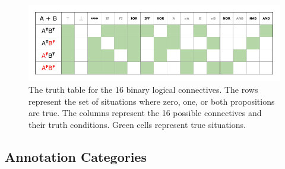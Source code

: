 \documentclass[floatsintext,man]{apa6}
\theoremstyle{definition}
\theoremstyle{definition}
\theoremstyle{definition}
\theoremstyle{remark}
\begin{document}
\begin{figure}[tb]

{\centering \includegraphics{figs/logicalConnectives-1} 

}

\caption{The truth table for the 16 binary logical connectives. The rows represent the set of situations where zero, one, or both propositions are true. The columns represent the 16 possible connectives and their truth conditions. Green cells represent true situations.}\label{fig:logicalConnectives}
\end{figure}

\subsection{Annotation Categories}\label{annotation-categories-1}
\end{document}
